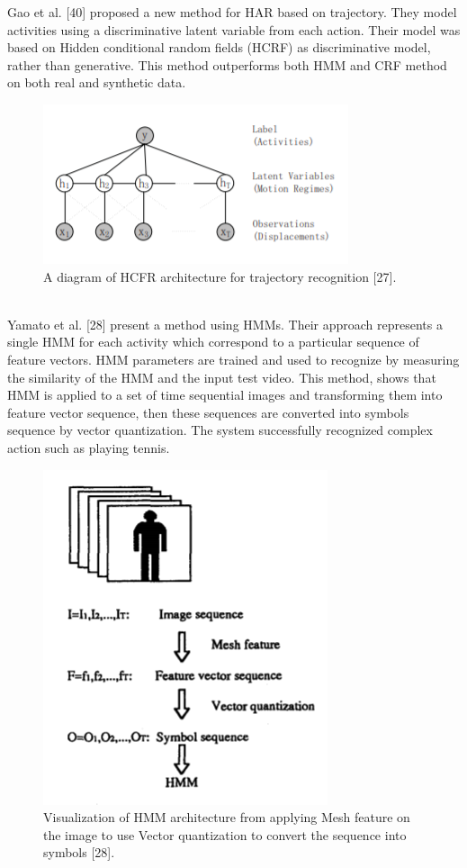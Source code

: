Gao et al. [40] proposed a new method for HAR based on trajectory. They model activities using a discriminative latent variable from each action. Their model was based on Hidden conditional random fields (HCRF) as discriminative model, rather than generative. This method outperforms both HMM and CRF method on both real and synthetic data.
\begin{figure}[ht]
\centering
\includegraphics{Figures/HCRF}
\decoRule
\caption[A diagram of HCFR architecture for trajectory recognition "27".]{A diagram of HCFR architecture for trajectory recognition [27].}
\label{fig:la}
\end{figure}\\

Yamato et al. [28] present a method using HMMs. Their approach represents a single HMM for each activity which correspond to a particular sequence of feature vectors. HMM parameters are trained and used to recognize by measuring the similarity of the HMM and the input test video. This method, shows that HMM is applied to a set of time sequential images and transforming them into feature vector sequence, then these sequences are converted into symbols sequence by vector quantization. The system successfully recognized complex action such as playing tennis.\\

\begin{figure}[ht]
\centering
\includegraphics{Figures/qw}
\decoRule
\caption[Visualization of HMM architecture from applying Mesh feature on the image to use Vector quantization to convert the sequence into symbols "28".]{Visualization of HMM architecture from applying Mesh feature on the image to use Vector quantization to convert the sequence into symbols [28].}
\label{fig:la}
\end{figure}

